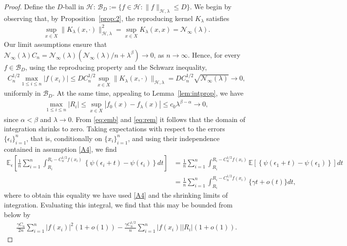 \documentclass[11pt]{article}
\theoremstyle{definition}
\theoremstyle{remark}
\begin{document}
\begin{proof}

Define the $D$-ball in $\mathcal{H}$: $\mathcal{B}_{D} := \{f \in \mathcal{H}: \|f\|_{\mathcal{H},\lambda} \leq D\}$. We begin by observing that, by Proposition~\ref{prop:2}, the reproducing kernel $K_{\lambda}$ satisfies
\begin{align*}
\sup_{x \in X}\|K_{\lambda}(x, \cdot)\|_{\mathcal{H},\lambda}^2 = \sup_{x \in X} K_{\lambda}(x,x)  = \mathcal{N}_{\infty}(\lambda).
\end{align*}
Our limit assumptions ensure that $\mathcal{N}_{\infty}(\lambda) C_n = \mathcal{N}_{\infty}(\lambda)( \mathcal{N}_{\infty}(\lambda)/n + \lambda^{\beta}) \to 0$, as $n \to \infty$. Hence, for every $f \in \mathcal{B}_D$, using the reproducing property and the Schwarz inequality,
\begin{align}
\label{eq:emb}
C_n^{1/2} \max_{1\leq i \leq n} |f(x_i)| \leq D C_n^{1/2} \sup_{x \in X} \|K_{\lambda}(x,\cdot)\|_{\mathcal{H}, \lambda} = D C_n^{1/2} \sqrt{\mathcal{N}_{\infty}(\lambda)} \to 0,
\end{align}
uniformly in $\mathcal{B}_D$. At the same time, appealing to Lemma~\ref{lem:intprop}, we have
\begin{align}
\label{eq:rem}
\max_{1 \leq i \leq n} |R_i| \leq \sup_{x \in X} |f_0(x) - f_{\lambda}(x)| \leq c_0 \lambda^{\beta-\alpha} \to 0,
\end{align}
since $\alpha<\beta$ and $\lambda \to 0$. From \eqref{eq:emb} and \eqref{eq:rem} it follows that the domain of integration shrinks to zero. Taking expectations with respect to the errors $\{\epsilon_i\}_{i=1}^n$, that is, conditionally on $\{x_i\}_{i=1}^n$, and using their independence contained in assumption \ref{A4}, we find
\begin{align*}
\mathbb{E}_{\epsilon} \left[ \frac{1}{n} \sum_{i=1}^n \int_{R_i}^{R_i-C_n^{1/2}f(x_i)} \left\{ \psi\left(\epsilon_i+t \right) - \psi \left( \epsilon_i \right) \right\} d t \right] & = \frac{1}{n} \sum_{i=1}^n \int_{R_i}^{R_i-C_n^{1/2}f(x_i)} \mathbb{E}[\left\{ \psi\left(\epsilon_1+t \right) - \psi \left( \epsilon_1 \right) \right\}] d t 
\\ & = \frac{1}{n} \sum_{i=1}^n \int_{R_i}^{R_i-C_n^{1/2}f(x_i)} \{\gamma t + o(t) \} d t,
\end{align*}
where to obtain this equality we have used \ref{A4} and the shrinking limits of integration. Evaluating this integral, we find that this may be bounded from below by
\begin{align*}
\frac{\gamma C_n }{2 n} \sum_{i=1}^n |f(x_i)|^2(1+o(1))  - \frac{\gamma C_n^{1/2}}{n} \sum_{i=1}^n |f(x_i)| |R_i| (1+o(1)).

\end{align*}
\end{proof}
\end{document}

